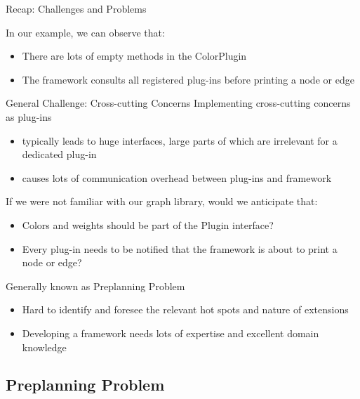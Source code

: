\begin{frame}{Recap: Challenges and Problems}
	\begin{mycolumns}[widths={50,50}]
		\begin{example}{}
			In our example, we can observe that:
			\begin{itemize}
				\item There are lots of empty methods in the ColorPlugin 
				\item The framework consults all registered plug-ins before printing a node or edge
			\end{itemize}
		\end{example}	
		\pause
		\begin{definition}{General Challenge: Cross-cutting Concerns}
			Implementing cross-cutting concerns as plug-ins 
			\begin{itemize}				
				\item typically leads to huge interfaces, large parts of which are irrelevant for a dedicated plug-in 
				\item causes lots of communication overhead between plug-ins and framework
			\end{itemize}
		\end{definition}
		\pause
	\mynextcolumn
		\begin{example}{}
			If we were not familiar with our graph library, would we anticipate that:
			\begin{itemize}
				\item Colors and weights should be part of the Plugin interface?
				\item Every plug-in needs to be notified that the framework is about to print a node or edge? 
			\end{itemize}
		\end{example}
		\pause
		\begin{definition}{Generally known as Preplanning Problem}
			\begin{itemize}
				\item Hard to identify and foresee the relevant hot spots and nature of extensions
				\item Developing a framework needs lots of expertise and excellent domain knowledge 
			\end{itemize}
		\end{definition}
	\end{mycolumns}
\end{frame}

\subsection{Preplanning Problem}

